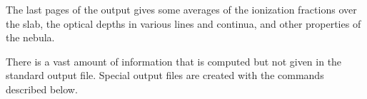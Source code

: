 The last pages of the output gives some averages of the ionization
fractions over the slab, the optical depths in various lines and continua,
and other properties of the nebula.

There is a vast amount of information that is computed but not given
in the standard output file.  Special output files are created with the
 commands described below.
